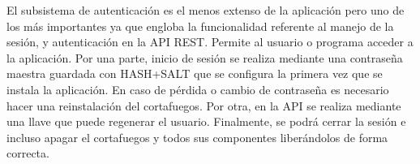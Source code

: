 El subsistema de autenticación es el menos extenso de la aplicación pero uno de los más importantes ya que engloba la funcionalidad referente al manejo de la sesión, y autenticación en la API REST. Permite al usuario o programa acceder a la aplicación.
Por una parte, inicio de sesión se realiza mediante una contraseña maestra guardada con HASH+SALT que se configura la primera vez que se instala la aplicación. En caso de pérdida o cambio de contraseña es necesario hacer una reinstalación del cortafuegos. Por otra, en la API se realiza mediante una llave que puede regenerar el usuario.
Finalmente, se podrá cerrar la sesión e incluso apagar el cortafuegos y todos sus componentes liberándolos de forma correcta.
